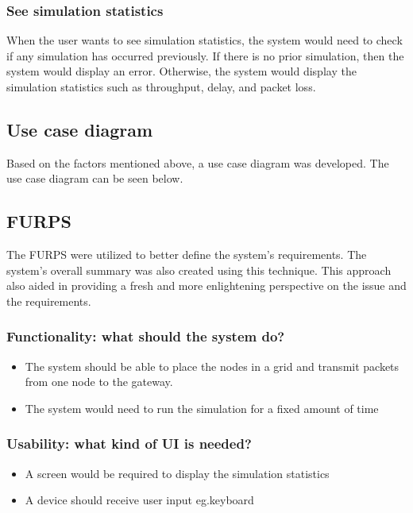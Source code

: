 \subsubsection{See simulation statistics}
When the user wants to see simulation statistics, the system would need to check if any simulation has occurred previously. If there is no prior simulation, then the system would display an error. Otherwise, the system would display the simulation statistics such as throughput, delay, and packet loss.

\subsection{Use case diagram}
Based on the factors mentioned above, a use case diagram was developed. The use case diagram can be seen below.

\subsection{FURPS}

The FURPS were utilized to better define the system's requirements. The system's overall summary was also created using this technique. This approach also aided in providing a fresh and more enlightening perspective on the issue and the requirements.

\subsubsection{Functionality: what should the system do?}
\begin{itemize}
    \item The system should be able to place the nodes in a grid and transmit packets from one node to the gateway.
    
    
    \item The system would need to run the simulation for a fixed amount of time

    
\end{itemize}

\subsubsection{Usability: what kind of UI is needed?}
\begin{itemize}
    \item A screen would be required to display the simulation statistics
    \item A device should receive user input eg.keyboard
\end{itemize}

